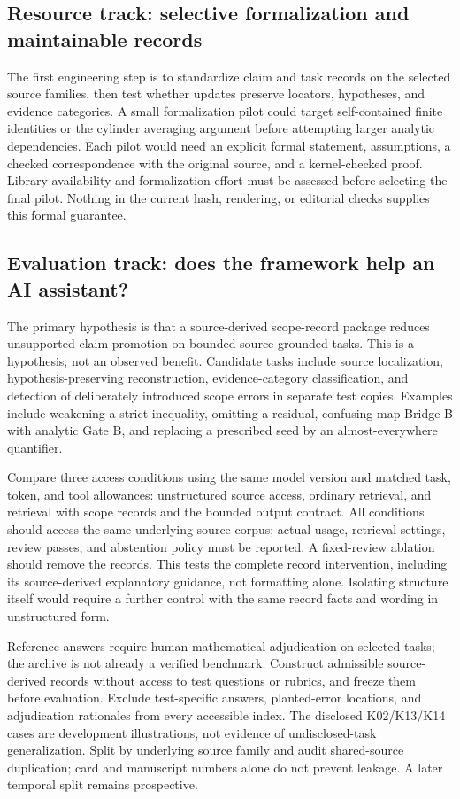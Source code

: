 \subsection{Resource track: selective formalization and maintainable records}
The first engineering step is to standardize claim and task records on the selected source families, then test whether updates preserve locators, hypotheses, and evidence categories. A small formalization pilot could target self-contained finite identities or the cylinder averaging argument before attempting larger analytic dependencies. Each pilot would need an explicit formal statement, assumptions, a checked correspondence with the original source, and a kernel-checked proof. Library availability and formalization effort must be assessed before selecting the final pilot. Nothing in the current hash, rendering, or editorial checks supplies this formal guarantee.

\subsection{Evaluation track: does the framework help an AI assistant?}
The primary hypothesis is that a source-derived scope-record package reduces unsupported claim promotion on bounded source-grounded tasks. This is a hypothesis, not an observed benefit. Candidate tasks include source localization, hypothesis-preserving reconstruction, evidence-category classification, and detection of deliberately introduced scope errors in separate test copies. Examples include weakening a strict inequality, omitting a residual, confusing map Bridge B with analytic Gate B, and replacing a prescribed seed by an almost-everywhere quantifier.

Compare three access conditions using the same model version and matched task, token, and tool allowances: unstructured source access, ordinary retrieval, and retrieval with scope records and the bounded output contract. All conditions should access the same underlying source corpus; actual usage, retrieval settings, review passes, and abstention policy must be reported. A fixed-review ablation should remove the records. This tests the complete record intervention, including its source-derived explanatory guidance, not formatting alone. Isolating structure itself would require a further control with the same record facts and wording in unstructured form.

Reference answers require human mathematical adjudication on selected tasks; the archive is not already a verified benchmark. Construct admissible source-derived records without access to test questions or rubrics, and freeze them before evaluation. Exclude test-specific answers, planted-error locations, and adjudication rationales from every accessible index. The disclosed K02/K13/K14 cases are development illustrations, not evidence of undisclosed-task generalization. Split by underlying source family and audit shared-source duplication; card and manuscript numbers alone do not prevent leakage. A later temporal split remains prospective.

